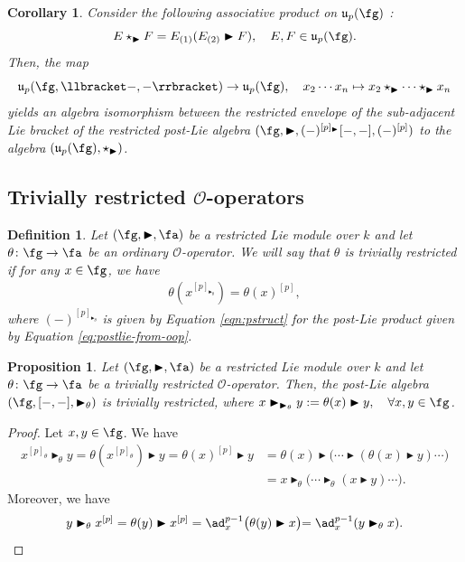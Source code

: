 \documentclass[12pt]{article}
\newcommand{\btr}{\blacktriangleright}
\newcommand{\mo}{\mathcal{O}}
\newtheorem{proposition}[theorem]{Proposition}
\newtheorem{corollary}[theorem]{Corollary}
\newtheorem{definition}[theorem]{Definition}
\begin{document}
\begin{corollary} Consider the following associative product on $\mathfrak{u}_p(\fg)$ : 
$$
E \star_{\btr} F = E_{(1)}(E_{(2)} \btr F),\quad E,F \in \mathfrak{u}_p(\fg).
$$
Then, the map
$$
\mathfrak{u}_p(\fg,\llbracket -,-\rrbracket) \to \mathfrak{u}_p(\fg),\quad x_2\cdots x_n \mapsto x_2 \star_{\btr} \cdots \star_{\btr} x_n
$$
yields an algebra isomorphism between the restricted envelope of the sub-adjacent Lie bracket of the restricted post-Lie algebra $(\fg,\btr, (-)^{[p]_{\btr}} [-,-],(-)^{[p]})$ to the algebra $(\mathfrak{u}_p(\fg), \star_{\btr})$.
\end{corollary}
\subsection{Trivially restricted $\mo$-operators}
\begin{definition}
Let $(\fg,\btr,\fa)$ be a restricted Lie module over $k$ and let ${\theta}\colon \fg \to \fa$ be an ordinary $\mathcal{O}$-operator. We will say that ${\theta}$ is \emph{trivially restricted} if for any $x \in \fg$, we have
\begin{align}
{\theta}(x^{[p]_{\btr_{\theta}}}) = \theta(x)^{[p]},
\end{align} where $(-)^{[p]_{\btr_{\theta}}}$ is given by Equation \eqref{eqn:pstruct} for the post-Lie product given by Equation \eqref{eq:postlie-from-oop}.
\end{definition}

\begin{proposition}\label{prop:restricted-o-op}
Let $(\fg,\btr,\fa)$ be a restricted Lie module over $k$ and let $\theta\colon \fg \to \fa$ be a trivially restricted $\mathcal{O}$-operator. Then, the post-Lie algebra $(\fg,[-,-],\btr_{\theta})$ is trivially restricted, where $x\btr_{\btr_{\theta}} y:={\theta}(x)\btr y,\quad\forall x,y\in \fg$.
\end{proposition}
\begin{proof}
Let $x,y\in\fg$. We have
\begin{align*}
x^{[p]_{\theta}}\btr_{\theta} y={\theta}(x^{[p]_{\theta}})\btr y={\theta}(x)^{[p]}\btr y&={\theta}(x)\btr\bigl(\cdots\btr ({\theta}(x)\btr y)\cdots\bigl)\\&=x\btr_{\theta}\bigl(\cdots\btr_{\theta} (x\btr y)\cdots\bigl).
\end{align*} Moreover, we have
\begin{align*}
 y\btr_{\theta} x^{[p]}={\theta}(y)\btr x^{[p]}=\ad_x^{p-1}\bigl({\theta}(y)\btr x\bigl)=\ad_x^{p-1}(y\btr_{\theta} x).
\end{align*}
\end{proof}
\end{document}

